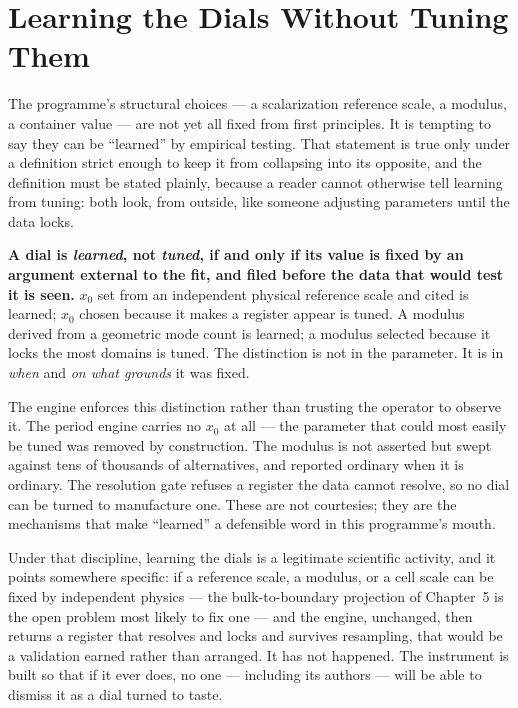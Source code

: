 \documentclass[11pt, letterpaper, openany]{book}
\begin{document}
\section{Learning the Dials Without Tuning Them}

The programme's structural choices --- a scalarization reference scale, a modulus, a container
value --- are not yet all fixed from first principles. It is tempting to say they can be
``learned'' by empirical testing. That statement is true only under a definition strict enough to
keep it from collapsing into its opposite, and the definition must be stated plainly, because a
reader cannot otherwise tell learning from tuning: both look, from outside, like someone adjusting
parameters until the data locks.

\begin{warningbox}
\textbf{A dial is \emph{learned}, not \emph{tuned}, if and only if its value is fixed by an argument
external to the fit, and filed before the data that would test it is seen.} $x_0$ set from an
independent physical reference scale and cited is learned; $x_0$ chosen because it makes a register
appear is tuned. A modulus derived from a geometric mode count is learned; a modulus selected
because it locks the most domains is tuned. The distinction is not in the parameter. It is in
\emph{when} and \emph{on what grounds} it was fixed.
\end{warningbox}

The engine enforces this distinction rather than trusting the operator to observe it. The period
engine carries no $x_0$ at all --- the parameter that could most easily be tuned was removed by
construction. The modulus is not asserted but swept against tens of thousands of alternatives, and
reported ordinary when it is ordinary. The resolution gate refuses a register the data cannot
resolve, so no dial can be turned to manufacture one. These are not courtesies; they are the
mechanisms that make ``learned'' a defensible word in this programme's mouth.

\begin{signalbox}
Under that discipline, learning the dials is a legitimate scientific activity, and it points
somewhere specific: if a reference scale, a modulus, or a cell scale can be fixed by independent
physics --- the bulk-to-boundary projection of Chapter~5 is the open problem most likely to fix
one --- and the engine, unchanged, then returns a register that resolves and locks and survives
resampling, that would be a validation earned rather than arranged. It has not happened. The
instrument is built so that if it ever does, no one --- including its authors --- will be able to
dismiss it as a dial turned to taste.
\end{signalbox}
\end{document}
